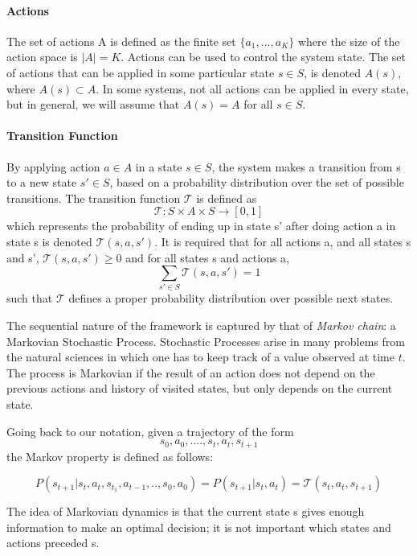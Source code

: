 \paragraph{Actions}
The set of actions A is defined as the finite set $\{a_1 , . . . , a_K \}$ where the size of the
action space is $|A| = K$. Actions can be used to control the system state.
The set of actions that can be applied in some particular state $s \in S$, is denoted $A(s)$,
where $A(s) \subset A$. In some systems, not all actions can be applied in every state, but in
general, we will assume that $A(s) = A$ for all $s \in S$.

\paragraph{Transition Function}
By applying action $a \in A$ in a state $s \in S$, the system makes a transition from s to a
new state $s' \in S$, based on a probability distribution over the set of possible transitions. 
The transition function $\mathcal{T}$ is defined as 
$$\mathcal{T} : S \times A \times S \rightarrow [0,1]$$ which represents the probability
of ending up in state s' after doing action a in state s is denoted $ \mathcal{T}(s,a,s')$. It is required that 
for all actions a, and all states s and s', $\mathcal{T} (s,a,s') \geq 0$ and for all states s and actions a, 
$$\sum_{s' \in S} \mathcal{T} (s,a,s') = 1$$
such that $\mathcal{T}$ defines a proper probability distribution over possible next states. \

The sequential nature of the framework is captured by that of \textit{Markov chain}:
a Markovian Stochastic Process. 
Stochastic Processes arise in many problems from the natural sciences
in which one has to keep track of a value observed at time $t$. The process is Markovian if the result of an action does not
depend on the previous actions and history of visited states, but only depends on the
current state.

Going back to our notation, given a trajectory of the form 
$$s_0, a_0, . . . . , s_t, a_t, s_{t+1}$$
the Markov property is defined as follows:

$$P(s_{t+1} | s_t ,a_t ,s_{t_1} ,a_{t-1} , . . ,s_0,a_0) = P(s_{t+1} | s_t ,a_t ) = \mathcal{T} (s_t ,a_t ,s_{t+1} )$$

The idea of Markovian dynamics is that the current state s gives enough information
to make an optimal decision; it is not important which states and actions preceded s.

